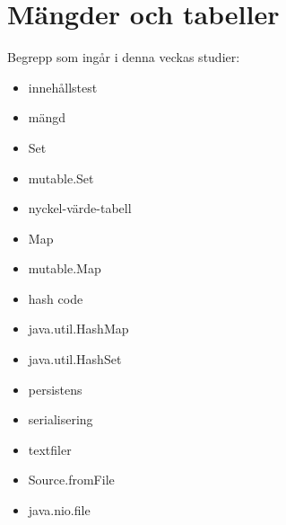 \chapter{Mängder och tabeller}\label{chapter:W09}
Begrepp som ingår i denna veckas studier:
\begin{itemize}[noitemsep,label={$\square$},leftmargin=*]
\item innehållstest
\item mängd
\item Set
\item mutable.Set
\item nyckel-värde-tabell
\item Map
\item mutable.Map
\item hash code
\item java.util.HashMap
\item java.util.HashSet
\item persistens
\item serialisering
\item textfiler
\item Source.fromFile
\item java.nio.file\end{itemize}
